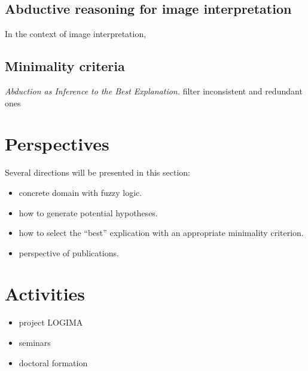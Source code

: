 \documentclass{article}
\begin{document}
\subsection{Abductive reasoning for image interpretation}
In the context of image interpretation,
\subsection{Minimality criteria}
\textit{Abduction as Inference to the Best Explanation.}
filter inconsistent and redundant ones

\section{Perspectives}\label{sec:persp}
Several directions will be presented in this section:
\begin{itemize}
 \item concrete domain with fuzzy logic.
 \item how to generate potential hypotheses.
 \item how to select the ``best'' explication with an appropriate minimality criterion.
 \item perspective of publications.
\end{itemize}

\section{Activities}
\begin{itemize}
 \item project LOGIMA
 \item seminars
 \item doctoral formation
\end{itemize}



\end{document}
